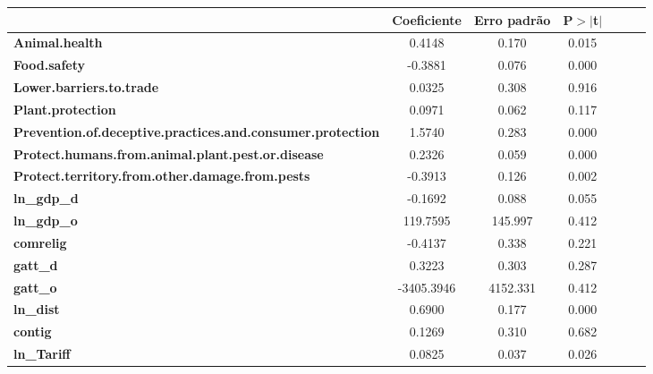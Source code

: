 \begin{center}
\begin{tabular}{lcccccc}
                                                                   & \textbf{Coeficiente} & \textbf{Erro padrão} &\textbf{P$> |$t$|$}\\
\midrule
\textbf{Animal.health}                                             &       0.4148  &        0.170     &        0.015\\
\textbf{Food.safety}                                               &      -0.3881  &        0.076     &        0.000\\
\textbf{Lower.barriers.to.trade}                                   &       0.0325  &        0.308     &        0.916\\
\textbf{Plant.protection}                                          &       0.0971  &        0.062     &        0.117\\
\textbf{Prevention.of.deceptive.practices.and.consumer.protection} &       1.5740  &        0.283     &        0.000\\
\textbf{Protect.humans.from.animal.plant.pest.or.disease}          &       0.2326  &        0.059     &        0.000\\
\textbf{Protect.territory.from.other.damage.from.pests}            &      -0.3913  &        0.126     &        0.002\\
\textbf{ln\_gdp\_d}                                                &      -0.1692  &        0.088     &        0.055\\
\textbf{ln\_gdp\_o}                                                &     119.7595  &      145.997     &        0.412\\
\textbf{comrelig}                                                  &      -0.4137  &        0.338     &        0.221\\
\textbf{gatt\_d}                                                   &       0.3223  &        0.303     &        0.287\\
\textbf{gatt\_o}                                                   &   -3405.3946  &     4152.331     &        0.412\\
\textbf{ln\_dist}                                                  &       0.6900  &        0.177     &        0.000\\
\textbf{contig}                                                    &       0.1269  &        0.310     &        0.682\\
\textbf{ln\_Tariff}                                                &       0.0825  &        0.037     &        0.026\\
\bottomrule
\end{tabular}
\end{center}